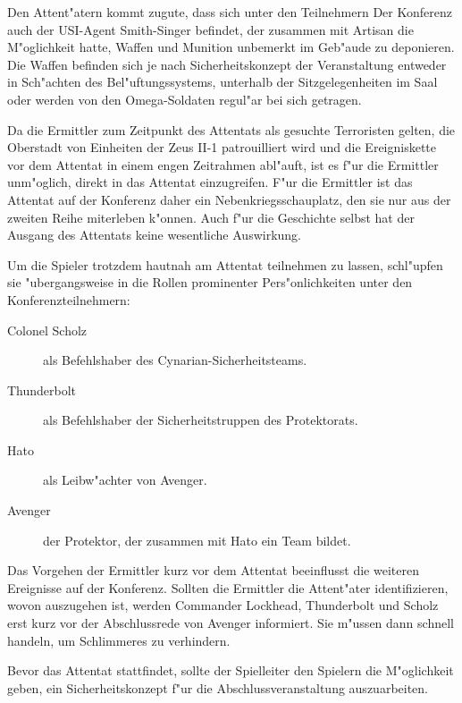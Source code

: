 Den Attent"atern kommt zugute, dass sich unter den Teilnehmern Der Konferenz auch der USI-Agent Smith-Singer befindet, der zusammen mit Artisan die M"oglichkeit hatte, Waffen und Munition unbemerkt im Geb"aude zu deponieren. Die Waffen befinden sich je nach Sicherheitskonzept der Veranstaltung entweder in Sch"achten des Bel"uftungssystems, unterhalb der Sitzgelegenheiten im Saal oder werden von den Omega-Soldaten regul"ar bei sich getragen.

Da die Ermittler zum Zeitpunkt des Attentats als gesuchte Terroristen gelten, die Oberstadt von Einheiten der Zeus II-1 patrouilliert wird und die Ereigniskette vor dem Attentat in einem engen Zeitrahmen abl"auft, ist es f"ur die Ermittler unm"oglich, direkt in das Attentat einzugreifen. F"ur die Ermittler ist das Attentat auf der Konferenz daher ein Nebenkriegsschauplatz, den sie nur aus der zweiten Reihe miterleben k"onnen. Auch f"ur die Geschichte selbst hat der Ausgang des Attentats keine wesentliche Auswirkung.

Um die Spieler trotzdem hautnah am Attentat teilnehmen zu lassen, schl"upfen sie "ubergangsweise in die Rollen prominenter Pers"onlichkeiten unter den Konferenzteilnehmern:

\begin{description}
	\item[Colonel Scholz] als Befehlshaber des Cynarian-Sicherheitsteams.
	\item[Thunderbolt] als Befehlshaber der Sicherheitstruppen des Protektorats.
	\item[Hato] als Leibw"achter von Avenger.
	\item[Avenger] der Protektor, der zusammen mit Hato ein Team bildet.
\end{description}

Das Vorgehen der Ermittler kurz vor dem Attentat beeinflusst die weiteren Ereignisse auf der Konferenz. Sollten die Ermittler die Attent"ater identifizieren, wovon auszugehen ist, werden Commander Lockhead, Thunderbolt und Scholz erst kurz vor der Abschlussrede von Avenger informiert. Sie m"ussen dann schnell handeln, um Schlimmeres zu verhindern.

Bevor das Attentat stattfindet, sollte der Spielleiter den Spielern die M"oglichkeit geben, ein Sicherheitskonzept f"ur die Abschlussveranstaltung auszuarbeiten.

